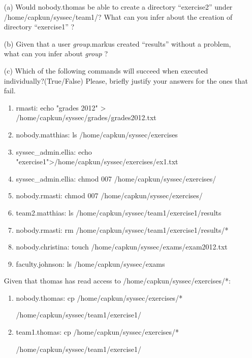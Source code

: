 \documentclass[a4paper,11pt]{article}
\begin{document}
\begin{itemize}
\item [(a)] Would nobody.thomas be able to create a directory ``exercise2'' under
/home/capkun/syssec/team1/? 
What can you infer about the creation of directory ``exercise1'' ? 
\item [(b)] Given that a user \emph{group}.markus created ``results'' without a problem, what can you infer about \emph{group} ? 
\item [(c)] Which of the following commands will succeed when executed
individually?(True/False) Please, briefly justify your answers for the ones that fail.
\begin{enumerate}
\item rmasti: echo "grades 2012" >  /home/capkun/syssec/grades/grades2012.txt
\item nobody.matthias: ls /home/capkun/syssec/exercises
\item syssec\_admin.ellia: echo "exercise1">/home/capkun/syssec/exercises/ex1.txt
\item syssec\_admin.ellia: chmod 007 /home/capkun/syssec/exercises/
\item nobody.rmasti: chmod 007 /home/capkun/syssec/exercises/
\item team2.matthias: ls /home/capkun/syssec/team1/exercise1/results
\item nobody.rmasti: rm /home/capkun/syssec/team1/exercise1/results/*
\item nobody.christina: touch /home/capkun/syssec/exams/exam2012.txt
\item faculty.johnson: ls  /home/capkun/syssec/exams 
\end{enumerate}
Given that thomas has read access to /home/capkun/syssec/exercises/*:
\begin{enumerate}
\addtocounter{enumi}{9}
\item nobody.thomas: cp /home/capkun/syssec/exercises/* 
\begin{flushright}/home/capkun/syssec/team1/exercise1/\end{flushright}
\item team1.thomas: cp /home/capkun/syssec/exercises/*  
\begin{flushright}/home/capkun/syssec/team1/exercise1/\end{flushright}
\end{enumerate}
\end{itemize}
\end{document}
